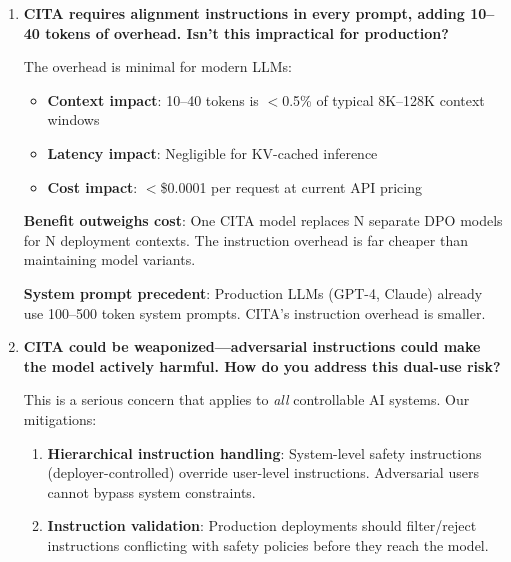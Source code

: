 \begin{enumerate}[label=\textbf{Q\arabic*.}, leftmargin=*, itemsep=8pt]
\textbf{Community invitation}: All code is public. Researchers with more compute can validate whether better-tuned PPO/GRPO closes the gap.

\vspace{4mm}

\item \textbf{CITA requires alignment instructions in every prompt, adding 10--40 tokens of overhead. Isn't this impractical for production?}

 The overhead is minimal for modern LLMs:

\begin{itemize}[leftmargin=*,itemsep=2pt]
    \item \textbf{Context impact}: 10--40 tokens is $<$0.5\% of typical 8K--128K context windows
    \item \textbf{Latency impact}: Negligible for KV-cached inference
    \item \textbf{Cost impact}: $<$\$0.0001 per request at current API pricing
\end{itemize}

\textbf{Benefit outweighs cost}: One CITA model replaces N separate DPO models for N deployment contexts. The instruction overhead is far cheaper than maintaining model variants.

\textbf{System prompt precedent}: Production LLMs (GPT-4, Claude) already use 100--500 token system prompts. CITA's instruction overhead is smaller.

\vspace{4mm}

\item \textbf{CITA could be weaponized---adversarial instructions could make the model actively harmful. How do you address this dual-use risk?}

 This is a serious concern that applies to \textit{all} controllable AI systems. Our mitigations:

\begin{enumerate}[leftmargin=*,itemsep=2pt]
    \item \textbf{Hierarchical instruction handling}: System-level safety instructions (deployer-controlled) override user-level instructions. Adversarial users cannot bypass system constraints.

    \item \textbf{Instruction validation}: Production deployments should filter/reject instructions conflicting with safety policies before they reach the model.


\end{enumerate}
\end{enumerate}
